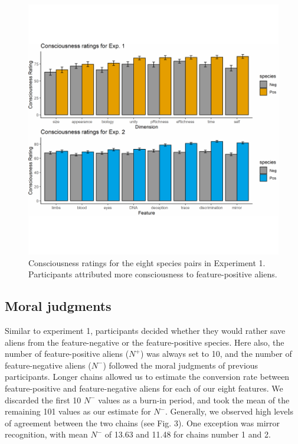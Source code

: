 \documentclass[10pt, letterpaper]{article}
\newenvironment{CodeChunk}{}{}
\begin{document}
\begin{CodeChunk}
\begin{figure}[H]

{\centering \includegraphics{figs/consciousness_plot2-1} 

}

\caption[Consciousness ratings for the eight species pairs in Experiment 1]{Consciousness ratings for the eight species pairs in Experiment 1. Participants attributed more consciousness to feature-positive aliens. }\label{fig:consciousness_plot2}
\end{figure}
\end{CodeChunk}

\hypertarget{moral-judgments-1}{%
\subsection{Moral judgments}\label{moral-judgments-1}}

Similar to experiment 1, participants decided whether they would rather
save aliens from the feature-negative or the feature-positive species.
Here also, the number of feature-positive aliens (\(N^+\)) was always
set to 10, and the number of feature-negative aliens (\(N^-\)) followed
the moral judgments of previous participants. Longer chains allowed us
to estimate the conversion rate between feature-positive and
feature-negative aliens for each of our eight features. We discarded the
first 10 \(N^-\) values as a burn-in period, and took the mean of the
remaining 101 values as our estimate for \(N^-\). Generally, we observed
high levels of agreement between the two chains (see Fig. 3). One
exception was mirror recognition, with mean \(N^-\) of 13.63 and 11.48
for chains number 1 and 2.
\end{document}
